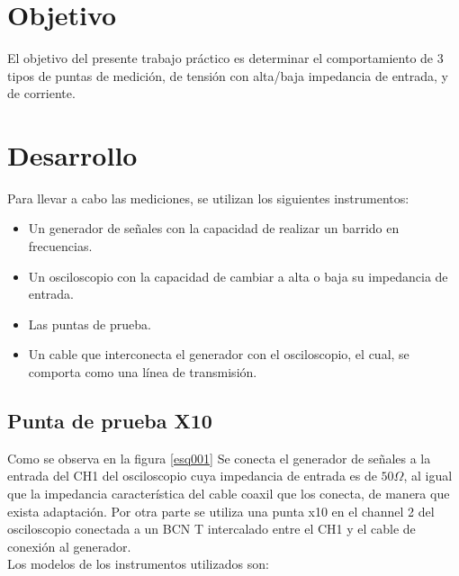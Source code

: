 \documentclass[a4paper,10pt]{article}
\title{  }
\begin{document}
	\maketitle %
	\newpage

	\tableofcontents %
	\newpage


	\section{Objetivo}
	
	\indent	El objetivo del presente trabajo práctico es determinar el 
	comportamiento de 3 tipos de puntas de medición, de tensión 
	con alta/baja impedancia de entrada, y de corriente.
	
	\newpage
	\section{Desarrollo}
		\indent Para llevar a cabo las mediciones, se utilizan los siguientes
		instrumentos:
		\begin{itemize}
			\item Un generador de señales con la capacidad de realizar un 
			barrido en frecuencias.
			\item Un osciloscopio con la capacidad de cambiar a alta o baja su
			impedancia de entrada.
			\item Las puntas de prueba.
			\item Un cable que interconecta el generador con el osciloscopio,
			el cual, se comporta como una línea de transmisión.
		\end{itemize}
				 
		\subsection{Punta de prueba X10}
		\indent Como se observa en la figura \ref{esq001} Se conecta el 
		generador de se\~nales a la entrada del CH1 del osciloscopio cuya 
		impedancia de entrada es de $50 \Omega$, al igual que la impedancia 
		caracter\'istica del cable coaxil que los conecta, de manera que 
		exista adaptaci\'on. Por otra parte se utiliza una punta x10 en el 
		channel 2 del osciloscopio conectada a un BCN T intercalado entre el 
		CH1 y el cable de conexión al generador. \\
		\indent Los modelos de los instrumentos utilizados son:
		
\end{document}
